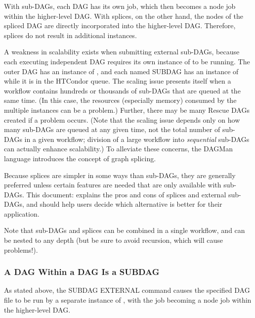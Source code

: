 With sub-DAGs, each DAG has its own  job, which
then becomes a node job within the higher-level DAG.  With splices,
on the other hand, the nodes of the spliced DAG are directly
incorporated into the higher-level DAG.  Therefore, splices do
not result in additional  instances.

A weakness in scalability exists when submitting external sub-DAGs,
because each executing independent DAG requires its own instance of
 to be running.
The outer DAG has an instance of , 
and each named SUBDAG has an instance of  while
it is in the HTCondor queue. 
The scaling issue presents itself when a workflow contains
hundreds or thousands of sub-DAGs that are queued at the same
time.  (In this case, the resources (especially memory) consumed
by the multiple  instances can be a problem.)
Further, there may be many Rescue DAGs created if a problem occurs.
(Note that the scaling issue depends only on how many
sub-DAGs are queued at any given time, not the total number
of sub-DAGs in a given workflow; division of a large workflow
into \emph{sequential} sub-DAGs can actually enhance scalability.)
To alleviate these concerns, the DAGMan language introduces
the concept of graph splicing.

Because splices are simpler in some ways than sub-DAGs, they are
generally preferred unless certain features are needed that
are only available with sub-DAGs.
This document:
explains the pros and cons of splices and external sub-DAGs, and
should help users decide which alternative is better for their application.

Note that sub-DAGs and splices can be combined in a single workflow,
and can be nested to any depth (but be sure to avoid recursion, which
will cause problems!).

\subsubsection{\label{sec:DAG-SubDAG}A DAG Within a DAG Is a SUBDAG}

As stated above, the SUBDAG EXTERNAL command causes the specified
DAG file to be run by a separate instance of ,
with the  job becoming a node job within the
higher-level DAG.

